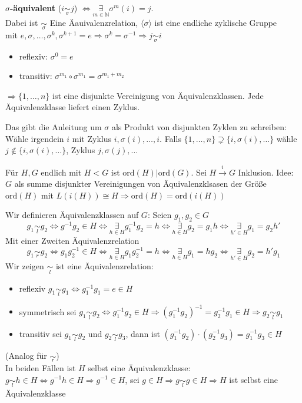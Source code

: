 \documentclass{article}
\newcommand{\N}{\mathbb{N}}
\newcommand{\ord}{\text{ord}}
\begin{document}
\textbf{$\sigma$-äquivalent} ($i\underset{\sigma}\sim j$)
$\Leftrightarrow\underset{m\in\N}\exists\sigma^m(i)=j$.\\
Dabei ist $\underset{\sigma}\sim$ Eine Äauivalenzrelation,
$\langle\sigma\rangle$ ist eine endliche zyklische Gruppe\\
mit $e,\sigma,\hdots,\sigma^k,\sigma^{k+1}=e
\Rightarrow\sigma^k=\sigma^{-1}\Rightarrow j\underset{\sigma}
\sim i$
\begin{itemize}
    \item reflexiv: $\sigma^0=e$
    \item transitiv: $\sigma^{m_1}\circ\sigma^{m_1}=
        \sigma^{m_1+m_2}$
\end{itemize}
$\Rightarrow\{1,\hdots,n\}$ ist eine disjunkte Vereinigung
von Äquivalenzklassen.
Jede Äquivalenzklasse liefert einen Zyklus.

Das gibt die Anleitung um $\sigma$ als Produkt von
disjunkten Zyklen zu schreiben: Wähle irgendein
$i$ mit Zyklus $i,\sigma(i),\hdots,i$.
Falls $\{1,\hdots,n\}\supsetneq\{i,\sigma(i),\hdots\}$
wähle $j\notin\{i,\sigma(i),\hdots\}$, Zyklus
$j,\sigma(j),\hdots$

Für $H,G$ endlich mit $H<G$ ist $\ord(H)|\ord(G)$.
Sei $H\overset{i}\to G$ Inklusion.
Idee: $G$ als summe disjunkter Vereinigungen
von Äquivalenzklsasen der Größe $\ord(H)$ mit
$L(i(H))\cong H \Rightarrow\ord(H)=\ord(i(H))$

Wir definieren Äquivalenzklassen auf $G$:
Seien $g_1,g_2\in G$
\begin{equation*}
    g_1\underset{l}\sim g_2 \Leftrightarrow g^{-1}g_2\in H
    \Leftrightarrow\underset{h\in H}\exists g_1^{-1}g_2=h
    \Leftrightarrow\underset{h\in H}\exists g_2=g_1h
    \Leftrightarrow\underset{h'\in H}\exists g_1=g_2h'
\end{equation*}
Mit einer Zweiten Äquivalenzrelation
\begin{equation*}
    g_1\underset{r}\sim g_2\Leftrightarrow g_1g_2^{-1}\in H
    \Leftrightarrow\underset{h\in H}\exists g_1g_2^{-1}=h
    \Leftrightarrow\underset{h\in H}\exists g_1=hg_2
    \Leftrightarrow\underset{h'\in H}\exists g_2=h'g_1
\end{equation*}
Wir zeigen $\underset{l}\sim$ ist eine Äquivalenzrelation:
\begin{itemize}
    \item reflexiv $g_1\underset{l}\sim g_1\Leftrightarrow
        g_1^{-1}g_1=e\in H$
    \item symmetrisch sei $g_1\underset{l}\sim g_2
        \Leftrightarrow g_1^{-1}g_2\in H
        \Rightarrow (g_1^{-1}g_2)^{-1}=g_2^{-1}g_1\in H
        \Rightarrow g_2\underset{l}\sim g_1$
    \item transitiv sei $g_1\underset{l}\sim g_2$ und
        $g_2\underset{l}\sim g_3$, dann ist
        $(g_1^{-1}g_2)\cdot (g_2^{-1}g_3)=g_1^{-1}g_3\in H$
\end{itemize}
(Analog für $\underset{r}\sim$)\\
In beiden Fällen ist $H$ selbst eine Äquivalenzklasse:
$g\underset{l}\sim h\in H\Leftrightarrow g^{-1}h\in H
\Rightarrow g^{-1}\in H$,
sei $g\in H\Rightarrow g\underset{l}\sim g\in H\Rightarrow H$
ist selbst eine Äquivalenzklasse
\end{document}
